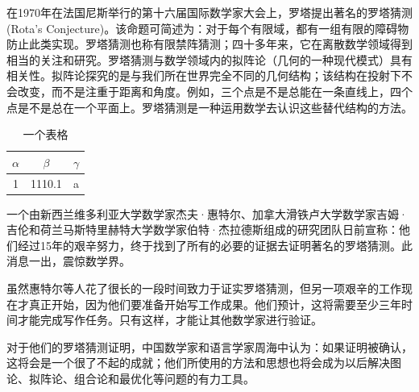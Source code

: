 \documentclass{yerbaformatPaper}
\begin{document}
在1970年在法国尼斯举行的第十六届国际数学家大会上，罗塔提出著名的罗塔猜测(Rota's Conjecture)。该命题可简述为：对于每个有限域，都有一组有限的障碍物防止此类实现。罗塔猜测也称有限禁阵猜测；四十多年来，它在离散数学领域得到相当的关注和研究。罗塔猜测与数学领域内的拟阵论（几何的一种现代模式）具有相关性。拟阵论探究的是与我们所在世界完全不同的几何结构；该结构在投射下不会改变，而不是注重于距离和角度。例如，三个点是不是总能在一条直线上，四个点是不是总在一个平面上。罗塔猜测是一种运用数学去认识这些替代结构的方法。

\begin{table}[h!]
	\begin{center}
		\caption{一个表格}
		\begin{tabular}{ccc}
			$\alpha$ & $\beta$ & $\gamma$ \\
			\hline
			1        & 1110.1  & a        \\
		\end{tabular}
	\end{center}
\end{table}

一个由新西兰维多利亚大学数学家杰夫·惠特尔、加拿大滑铁卢大学数学家吉姆·吉伦和荷兰马斯特里赫特大学数学家伯特·杰拉德斯组成的研究团队日前宣称：他们经过15年的艰辛努力，终于找到了所有的必要的证据去证明著名的罗塔猜测。此消息一出，震惊数学界。

虽然惠特尔等人花了很长的一段时间致力于证实罗塔猜测，但另一项艰辛的工作现在才真正开始，因为他们要准备开始写工作成果。他们预计，这将需要至少三年时间才能完成写作任务。只有这样，才能让其他数学家进行验证。

对于他们的罗塔猜测证明，中国数学家和语言学家周海中认为：如果证明被确认，这将会是一个很了不起的成就；他们所使用的方法和思想也将会成为以后解决图论、拟阵论、组合论和最优化等问题的有力工具。



\end{document}
